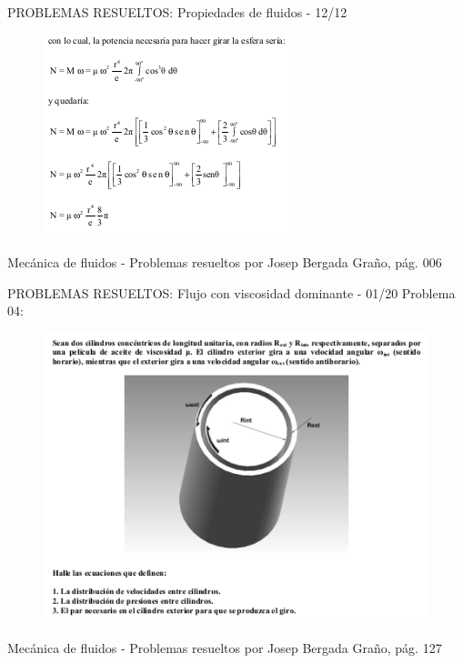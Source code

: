 \begin{frame}{PROBLEMAS RESUELTOS: Propiedades de fluidos - 12/12}
\justifying
\begin{figure}[H]
\centering
\includegraphics[scale=0.6]{Section_Files/S2-imagenes-Jhon/Book-ProbResuelts/P03-E04.png}
\end{figure}
{\tiny Mecánica de fluidos - Problemas resueltos por Josep Bergada Graño, pág. 006}
\end{frame}


\begin{frame}{PROBLEMAS RESUELTOS: Flujo con viscosidad dominante - 01/20}
\justifying
Problema 04:
\begin{figure}[H]
\centering
\includegraphics[scale=0.4]{Section_Files/S2-imagenes-Jhon/Book-ProbResuelts/P35-E01.png}
\end{figure}
{\tiny Mecánica de fluidos - Problemas resueltos por Josep Bergada Graño, pág. 127}
\end{frame}

